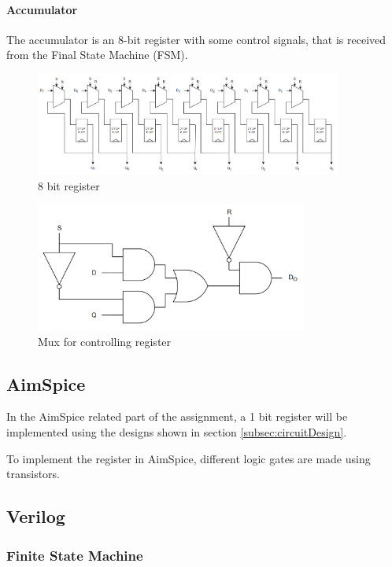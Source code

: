 \paragraph{Accumulator}
The accumulator is an 8-bit register with some control signals, that is received from the Final State Machine (FSM). 

\begin{figure}[H]
    \centering
    \includegraphics[width=0.9\textwidth]{Figures/8bitRegister.png}
    \caption{8 bit register}
    \label{fig:fulladder}
\end{figure}
\begin{figure}[H]
    \centering
    \includegraphics[width=0.8\textwidth]{Figures/Mux.png}
    \caption{Mux for controlling register}
    \label{fig:fulladder}
\end{figure}

\subsection{AimSpice}
In the AimSpice related part of the assignment, a 1 bit register will be implemented using the designs shown in section \ref{subsec:circuitDesign}. 

To implement the register in AimSpice, different logic gates are made using transistors.


\subsection{Verilog}


\subsubsection{Finite State Machine}
\label{subsec:fsm_}


